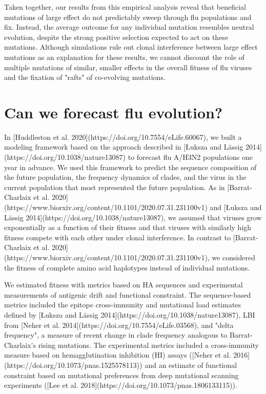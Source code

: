 Taken together, our results from this empirical analysis reveal that beneficial mutations of large effect do not predictably sweep through flu populations and fix.
Instead, the average outcome for any individual mutation resembles neutral evolution, despite the strong positive selection expected to act on these mutations.
Although simulations rule out clonal interference between large effect mutations as an explanation for these results, we cannot discount the role of multiple mutations of similar, smaller effects in the overall fitness of flu viruses and the fixation of "rafts" of co-evolving mutations.

\section{Can we forecast flu evolution?}

In [Huddleston et al. 2020](https://doi.org/10.7554/eLife.60067), we built a modeling framework based on the approach described in [Łuksza and Lässig 2014](https://doi.org/10.1038/nature13087) to forecast flu A/H3N2 populations one year in advance.
We used this framework to predict the sequence composition of the future population, the frequency dynamics of clades, and the virus in the current population that most represented the future population.
As in [Barrat-Charlaix et al. 2020](https://www.biorxiv.org/content/10.1101/2020.07.31.231100v1) and [Łuksza and Lässig 2014](https://doi.org/10.1038/nature13087), we assumed that viruses grow exponentially as a function of their fitness and that viruses with similarly high fitness compete with each other under clonal interference.
In contrast to [Barrat-Charlaix et al. 2020](https://www.biorxiv.org/content/10.1101/2020.07.31.231100v1), we considered the fitness of complete amino acid haplotypes instead of individual mutations.

We estimated fitness with metrics based on HA sequences and experimental measurements of antigenic drift and functional constraint.
The sequence-based metrics included the epitope cross-immunity and mutational load estimates defined by [Łuksza and Lässig 2014](https://doi.org/10.1038/nature13087), LBI from [Neher et al. 2014](https://doi.org/10.7554/eLife.03568), and "delta frequency", a measure of recent change in clade frequency analogous to Barrat-Charlaix's rising mutations.
The experimental metrics included a cross-immunity measure based on hemagglutination inhibition (HI) assays ([Neher et al. 2016](https://doi.org/10.1073/pnas.1525578113)) and an estimate of functional constraint based on mutational preferences from deep mutational scanning experiments ([Lee et al. 2018](https://doi.org/10.1073/pnas.1806133115)).

